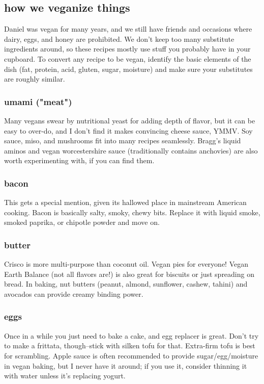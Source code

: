 \subsection{how we veganize things}
Daniel was vegan for many years, and we still have friends and occasions where dairy, eggs, and honey are prohibited. We don't keep too many substitute ingredients around, so these recipes mostly use stuff you probably have in your cupboard. To convert any recipe to be vegan, identify the basic elements of the dish (fat, protein, acid, gluten, sugar, moisture) and make sure your substitutes are roughly similar.

\subsubsection{umami ("meat")}
Many vegans swear by nutritional yeast for adding depth of flavor, but it can be easy to over-do, and I don't find it makes convincing cheese sauce, YMMV. Soy sauce, miso, and mushrooms fit into many recipes seamlessly. Bragg's liquid aminos and vegan worcestershire sauce (traditionally contains anchovies) are also worth experimenting with, if you can find them.

\subsubsection{bacon}
This gets a special mention, given its hallowed place in mainstream American cooking. Bacon is basically salty, smoky, chewy bits. Replace it with liquid smoke, smoked paprika, or chipotle powder and move on.

\subsubsection{butter}
Crisco is more multi-purpose than coconut oil. Vegan pies for everyone! Vegan Earth Balance (not all flavors are!) is also great for biscuits or just spreading on bread. In baking, nut butters (peanut, almond, sunflower, cashew, tahini) and avocados can provide creamy binding power.

\subsubsection{eggs}
Once in a while you just need to bake a cake, and egg replacer is great. Don't try to make a frittata, though--stick with silken tofu for that. Extra-firm tofu is best for scrambling. Apple sauce is often recommended to provide sugar/egg/moisture in vegan baking, but I never have it around; if you use it, consider thinning it with water unless it's replacing yogurt.


